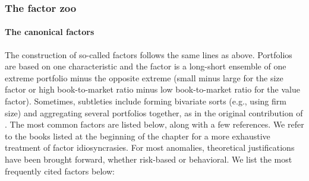 \subsubsection{The factor zoo}

\paragraph{The canonical factors}

The construction of so-called factors follows the same lines as above. Portfolios are based on one characteristic and the factor is a long-short ensemble of one extreme portfolio minus the opposite extreme (small minus large for the size factor or high book-to-market ratio minus low book-to-market ratio for the value factor). Sometimes, subtleties include forming bivariate sorts (e.g., using firm size) and aggregating several portfolios together, as in the original contribution of \cite{fama1993common}. The most common factors are listed below, along with a few references. We refer to the books listed at the beginning of the chapter for a more exhaustive treatment of factor idiosyncrasies. For most anomalies, theoretical justifications have been brought forward, whether risk-based or behavioral. We list the most frequently cited factors below:

